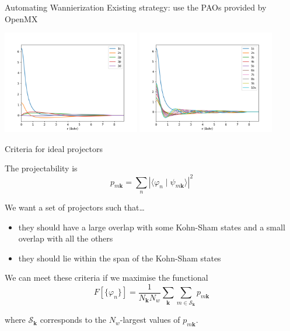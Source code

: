 \documentclass[xcolor=table,aspectratio=169]{beamer}
\numberwithin{equation}{section}
\begin{document}
\begin{frame}{Automating Wannierization}
    Existing strategy: use the PAOs provided by OpenMX

    \includegraphics[width=0.45\textwidth]{figures/Li8.0.pao_2_2_1_0.png}
    \includegraphics[width=0.45\textwidth]{figures/Li8.0.pao_10_0_0_0.png}

\end{frame}

\begin{frame}{Criteria for ideal projectors}

   The projectability is
   \begin{equation*}
      p_{m\mathbf{k}} = \sum_n |\langle \varphi_n \mid \psi_{m\mathbf{k}}\rangle |^2
   \end{equation*}

   We want a set of projectors such that\dots
   \begin{itemize}
      \item they should have a large overlap with some Kohn-Sham states and a small overlap with all the others%
      \item they should lie within the span of the Kohn-Sham states%
   \end{itemize}

   We can meet these criteria if we maximise the functional
   \begin{equation*}
      F[\{\varphi_n\}] = \frac{1}{N_\mathbf{k} N_w} \sum_{\mathbf{k}} \sum_{m \in \mathcal{S}_\mathbf{k}} p_{m\mathbf{k}}
   \end{equation*}

   where $\mathcal{S}_\mathbf{k}$ corresponds to the $N_w$-largest values of $p_{m\mathbf{k}}$.
\end{frame}
\end{document}
